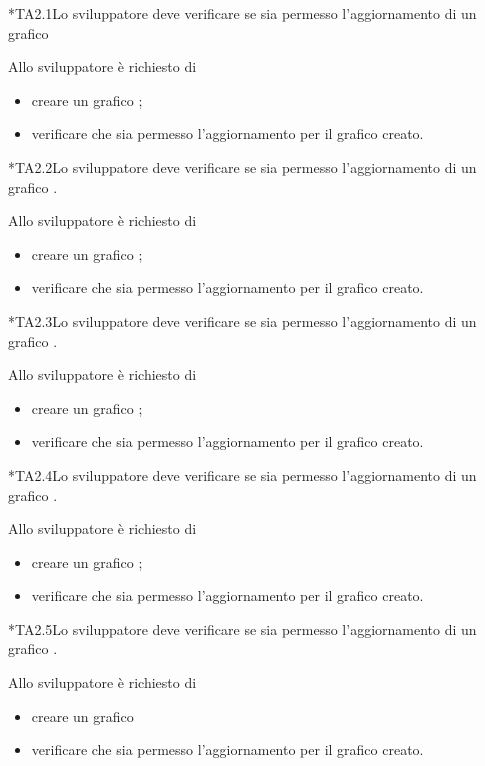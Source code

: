 	*{TA2.1}Lo sviluppatore deve verificare se sia permesso l'aggiornamento  di un grafico 
		
		Allo sviluppatore è richiesto di
		\begin{itemize}
			\item creare un grafico ;
			\item verificare che sia permesso l'aggiornamento  per il grafico creato.
		\end{itemize}

	*{TA2.2}Lo sviluppatore deve verificare se sia permesso l'aggiornamento di un grafico .
		
		Allo sviluppatore è richiesto di
		\begin{itemize}
			\item creare un grafico ;
			\item verificare che sia permesso l'aggiornamento  per il grafico creato.
		\end{itemize}

	*{TA2.3}Lo sviluppatore deve verificare se sia permesso l'aggiornamento  di un grafico .
		
		Allo sviluppatore è richiesto di
		\begin{itemize}
			\item creare un grafico ;
			\item verificare che sia permesso l'aggiornamento  per il grafico creato.
		\end{itemize}

	*{TA2.4}Lo sviluppatore deve verificare se sia permesso l'aggiornamento  di un grafico .
		
		Allo sviluppatore è richiesto di
		\begin{itemize}
			\item creare un grafico ;
			\item verificare che sia permesso l'aggiornamento  per il grafico creato.
		\end{itemize}

	*{TA2.5}Lo sviluppatore deve verificare se sia permesso l'aggiornamento  di un grafico .
		
		Allo sviluppatore è richiesto di
		\begin{itemize}
			\item creare un grafico 
			\item verificare che sia permesso l'aggiornamento  per il grafico creato.
		\end{itemize}

